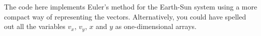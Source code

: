 \documentclass[%
oneside,                 %
final,                   %
10pt]{article}
\begin{document}
The code here implements Euler's method for the Earth-Sun system using a more compact way of representing the vectors. Alternatively, you could have spelled out all the variables $v_x$, $v_y$, $x$ and $y$ as one-dimensional arrays. 
\end{document}
